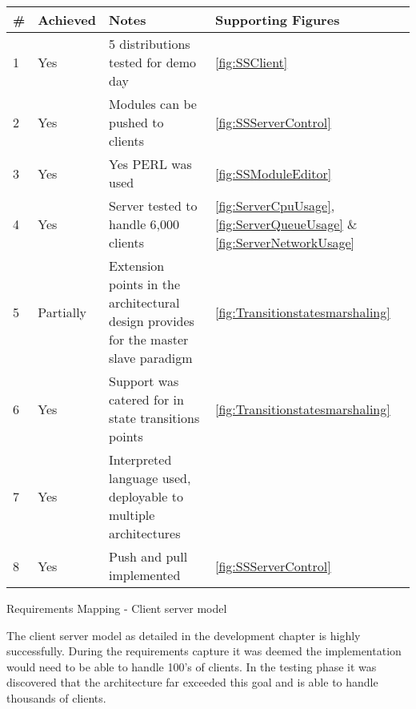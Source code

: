 	\begin{tablehere}
	
		\small{\begin{tabular}{ | p{5mm} | p{16mm} | p{100mm} | p{16mm} |}
		\hline
		\textbf{\#}							
		
		& \textbf{Achieved} 				& \textbf{Notes} 																									& \textbf{Supporting Figures}													\\ \hline
		1	 	 	 						& Yes					& 5 distributions tested for demo day				 										& \ref{fig:SSClient}															\\ \hline
		2	 	 	 						& Yes					& Modules can be pushed to clients 															& \ref{fig:SSServerControl}														\\ \hline
		3	 	 	 						& Yes					& Yes PERL was used																			& \ref{fig:SSModuleEditor}														\\ \hline
		4	 	 	 						& Yes					& Server tested to handle 6,000 clients														& \ref{fig:ServerCpuUsage}, \ref{fig:ServerQueueUsage} 
																																								\& \ref{fig:ServerNetworkUsage}													\\ \hline
		5	 	 	 						& Partially				& Extension points in the architectural design provides for the master slave paradigm		& \ref{fig:Transitionstatesmarshaling}											\\ \hline
		6	 	 	 						& Yes					& Support was catered for in state transitions points								 		& \ref{fig:Transitionstatesmarshaling}											\\ \hline
		7	 	 	 						& Yes					& Interpreted language used, deployable to multiple architectures							&																				\\ \hline
		8	 	 	 						& Yes					& Push and pull implemented																	& \ref{fig:SSServerControl}														\\ \hline
		
		\end{tabular}}
		
		\caption{Requirements Mapping - Client server model}
		\label{tab:RequirementsMappingClientservermodel}
		
	\end{tablehere}
	
	\vspace{5mm}
	\normalsize
	{
		The client server model as detailed in the development chapter is highly successfully. During the requirements capture it was deemed the implementation
		would need to be able to handle 100's of clients.   In the testing phase it was discovered that the architecture far exceeded this goal 
		and is able to handle thousands of clients.  
	}
	
